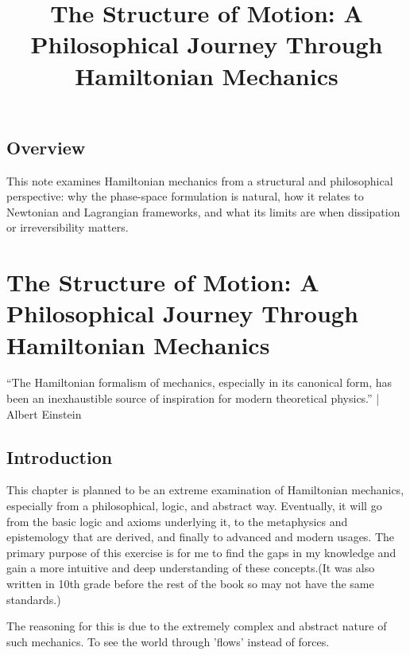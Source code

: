 \title{The Structure of Motion: A Philosophical Journey Through Hamiltonian Mechanics}

\section{Overview}
This note examines Hamiltonian mechanics from a structural and philosophical perspective: why the phase-space formulation is natural, how it relates to Newtonian and Lagrangian frameworks, and what its limits are when dissipation or irreversibility matters.


\chapter{The Structure of Motion: A Philosophical Journey Through Hamiltonian Mechanics}
“The Hamiltonian formalism of mechanics, especially in its canonical form, has been an inexhaustible source of inspiration for modern theoretical physics.” | Albert Einstein
\section{Introduction}
\par This chapter is planned to be an extreme examination of Hamiltonian mechanics, especially from a philosophical, logic, and abstract way. Eventually, it will go from the basic logic and axioms underlying it, to the metaphysics and epistemology that are derived, and finally to advanced and modern usages. The primary purpose of this exercise is for me to find the gaps in my knowledge and gain a more intuitive and deep understanding of these concepts.(It was also written in 10th grade before the rest of the book so may not have the same standards.)
\par The reasoning for this is due to the extremely complex and abstract nature of such mechanics. To see the world through 'flows' instead of forces.

